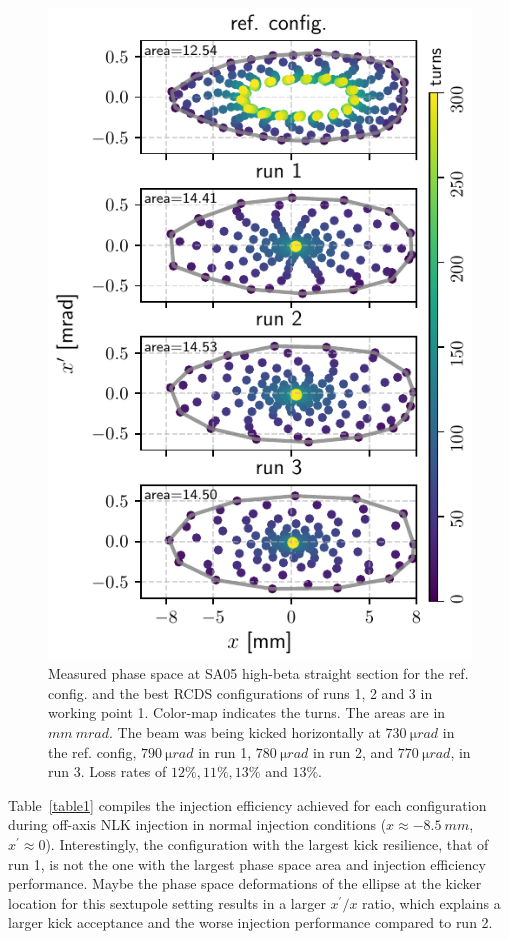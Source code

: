 \documentclass[a4paper,
               keeplastbox,   %
               ]{jacow}
\begin{document}
\begin{figure}[!h]
    \centering
    \includegraphics[width=\columnwidth]{WEPL087_f2.pdf}
    \caption{Measured phase space at SA05 high-beta straight section for the ref. config. and the best RCDS configurations of runs 1, 2 and 3 in working point 1. Color-map indicates the turns. The areas are in $\unit{mm}~\unit{mrad}$. The beam was being kicked horizontally at $730~\unit{\micro rad}$ in the ref. config, $790~\unit{\micro rad}$ in run 1, $780~\unit{\micro rad}$ in run 2, and $770~\unit{\micro rad}$, in run 3. Loss rates of  $12\%, 11\%, 13\%$ and $13\%$.} 
    \label{fig:oldtunes_phase}
\end{figure}
Table~\ref{table1} compiles the injection efficiency achieved for each configuration during off-axis NLK injection in normal injection conditions ($x\approx -8.5~\unit{mm}$, $x^\prime\approx 0 $). 
Interestingly, the configuration with the largest kick resilience, that of run 1, is not the one with the largest phase space area and injection efficiency performance. Maybe the phase space deformations of the ellipse at the kicker location for this sextupole setting results in a larger $x^\prime/x$ ratio, which explains a larger kick acceptance and the worse injection performance compared to run 2. 
\end{document}
